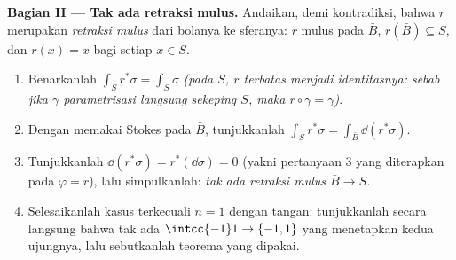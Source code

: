 \begin{problem}
\medskip
\noindent\textbf{Bagian II --- Tak ada retraksi mulus.} Andaikan,
demi kontradiksi, bahwa $r$ merupakan \emph{retraksi mulus} dari
bolanya ke sferanya: $r$ mulus pada 
$\bar B$, $r(\bar B) \subseteq S$, dan $r(x) = x$ bagi setiap
$x \in S$.
\begin{enumerate}[resume]
  \item Benarkanlah $\int_Sr^*\sigma = \int_S\sigma$
        \emph{(pada $S$, $r$ terbatas menjadi identitasnya: sebab jika
        $\gamma$ parametrisasi langsung sekeping
        $S$, maka $r\circ\gamma = \gamma$)}.
  \item Dengan memakai Stokes pada $\bar B$, tunjukkanlah $\int_Sr^*\sigma =
        \int_{\bar B}\dd(r^*\sigma)$.
  \item Tunjukkanlah $\dd(r^*\sigma) = r^*(\dd\sigma) = 0$ (yakni pertanyaan
        3 yang diterapkan pada $\varphi = r$), lalu simpulkanlah:
        \emph{tak ada retraksi mulus $\bar B \to S$.}
  \item Selesaikanlah kasus terkecuali $n = 1$ dengan tangan: tunjukkanlah
        secara langsung bahwa tak ada  $\intcc{-1}1 \to
        \{-1, 1\}$ yang menetapkan kedua ujungnya, lalu sebutkanlah
        teorema yang dipakai.
\end{enumerate}


\end{problem}
